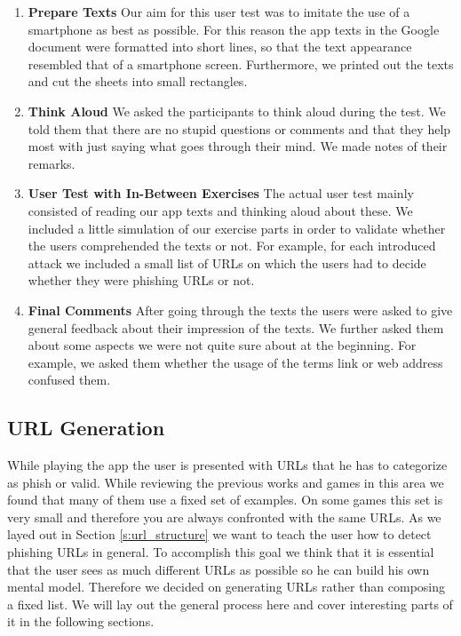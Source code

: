\begin{enumerate}
	\item\textbf{Prepare Texts} Our aim for this user test was to imitate the use of a smartphone as best as possible.
	For this reason the app texts in the Google document were formatted into short lines, so that the text appearance resembled that of a smartphone screen.
	Furthermore, we printed out the texts and cut the sheets into small rectangles.
	\item\textbf{Think Aloud} We asked the participants to think aloud during the test. 
	We told them that there are no stupid questions or comments and that they help most with just saying what goes through their mind.
	We made notes of their remarks.
	\item\textbf{User Test with In-Between Exercises} The actual user test mainly consisted of reading our app texts and thinking aloud about these.
	We included a little simulation of our exercise parts in order to validate whether the users comprehended the texts or not.
	For example, for each introduced attack we included a small list of URLs on which the users had to decide whether they were phishing URLs or not.
	\item\textbf{Final Comments} After going through the texts the users were asked to give general feedback about their impression of the texts. 
	We further asked them about some aspects we were not quite sure about at the beginning. 
	For example, we asked them whether the usage of the terms link or web address confused them.
\end{enumerate}


\subsection{URL Generation}
While playing the app the user is presented with URLs that he has to categorize as phish or valid.
While reviewing the previous works and games in this area we found that many of them use a fixed set of examples.
On some games this set is very small and therefore you are always confronted with the same URLs.
As we layed out in Section \ref{s:url_structure} we want to teach the user how to detect phishing URLs in general.
To accomplish this goal we think that it is essential that the user sees as much different URLs as possible so he can build his own mental model.
Therefore we decided on generating URLs rather than composing a fixed list.
We will lay out the general process here and cover interesting parts of it in the following sections.

